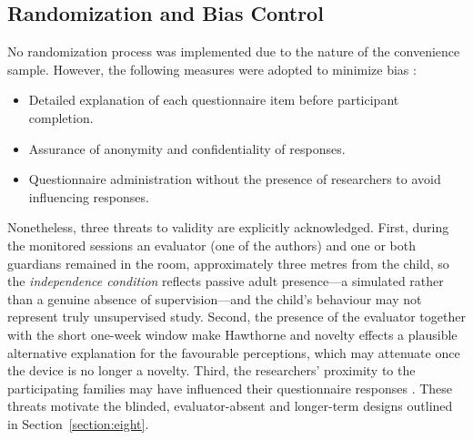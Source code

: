 \subsection{Randomization and Bias Control}
No randomization process was implemented due to the nature of the convenience sample. However, the following measures were adopted to minimize bias \citep{Huang2025How}:

\begin{itemize}
	\item Detailed explanation of each questionnaire item before participant completion.
	
	\item Assurance of anonymity and confidentiality of responses.
	
	\item Questionnaire administration without the presence of researchers to avoid influencing responses.
\end{itemize}

Nonetheless, three threats to validity are explicitly acknowledged. First, during the monitored sessions an evaluator (one of the authors) and one or both guardians remained in the room, approximately three metres from the child, so the \textit{independence condition} reflects passive adult presence---a simulated rather than a genuine absence of supervision---and the child's behaviour may not represent truly unsupervised study. Second, the presence of the evaluator together with the short one-week window make Hawthorne and novelty effects a plausible alternative explanation for the favourable perceptions, which may attenuate once the device is no longer a novelty. Third, the researchers' proximity to the participating families may have influenced their questionnaire responses \citep{DiPietro2025Meta}. These threats motivate the blinded, evaluator-absent and longer-term designs outlined in Section~\ref{section:eight}.


